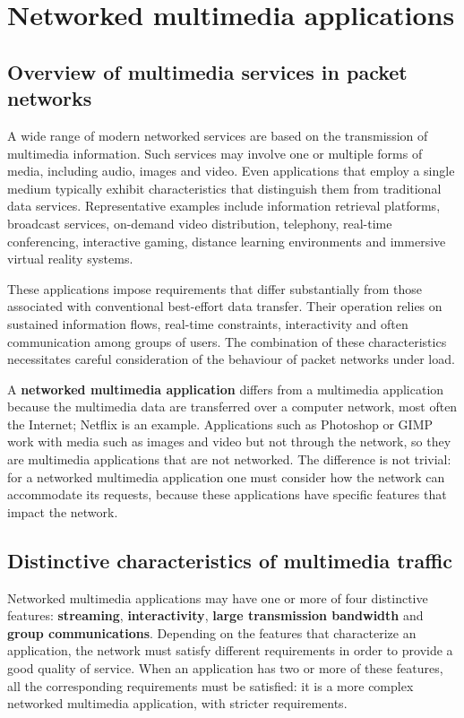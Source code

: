 \documentclass[11pt,a4paper,openany]{report}
\begin{document}
\section{Networked multimedia applications}

\subsection{Overview of multimedia services in packet networks}

A wide range of modern networked services are based on the transmission of multimedia information. Such services may involve one or multiple forms of media, including audio, images and video. Even applications that employ a single medium typically exhibit characteristics that distinguish them from traditional data services. Representative examples include information retrieval platforms, broadcast services, on-demand video distribution, telephony, real-time conferencing, interactive gaming, distance learning environments and immersive virtual reality systems.

These applications impose requirements that differ substantially from those associated with conventional best-effort data transfer. Their operation relies on sustained information flows, real-time constraints, interactivity and often communication among groups of users. The combination of these characteristics necessitates careful consideration of the behaviour of packet networks under load.

A \textbf{networked multimedia application} differs from a multimedia application because the multimedia data are transferred over a computer network, most often the Internet; Netflix is an example. Applications such as Photoshop or GIMP work with media such as images and video but not through the network, so they are multimedia applications that are not networked. The difference is not trivial: for a networked multimedia application one must consider how the network can accommodate its requests, because these applications have specific features that impact the network.

\subsection{Distinctive characteristics of multimedia traffic}
Networked multimedia applications may have one or more of four distinctive features: \textbf{streaming}, \textbf{interactivity}, \textbf{large transmission bandwidth} and \textbf{group communications}. Depending on the features that characterize an application, the network must satisfy different requirements in order to provide a good quality of service. When an application has two or more of these features, all the corresponding requirements must be satisfied: it is a more complex networked multimedia application, with stricter requirements.
\end{document}
